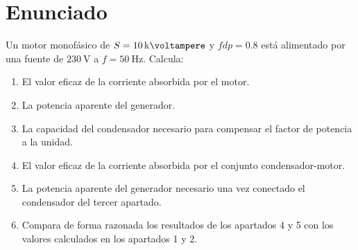 \section{Enunciado}
Un motor monofásico de $S = \qty{10}{\kilo\voltampere}$ y $fdp = 0.8$ está alimentado por una fuente de $\qty{230}{\volt}$ a $f = \qty{50}{\hertz}$. 
Calcula:
\begin{enumerate}
\item El valor eficaz de la corriente absorbida por el motor.
\item La potencia aparente del generador.
\item La capacidad del condensador necesario para compensar el factor de potencia a la unidad.
\item El valor eficaz de la corriente absorbida por el conjunto condensador-motor. 
\item La potencia aparente del generador necesario una vez conectado el condensador del tercer apartado.
\item Compara de forma razonada los resultados de los apartados 4 y 5 con los valores calculados en los apartados 1 y 2.
\end{enumerate}
